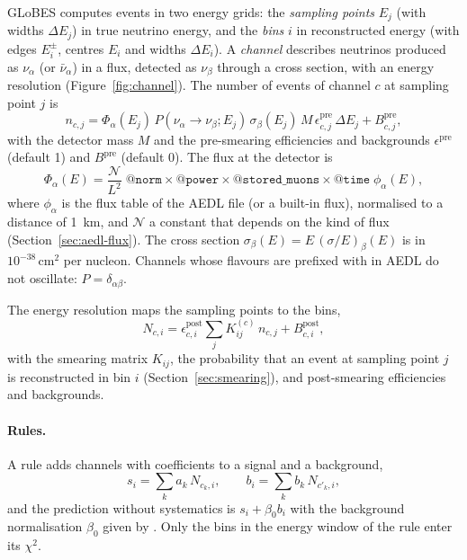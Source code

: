 GLoBES computes events in two energy grids: the \emph{sampling points} $E_j$
(with widths $\Delta E_j$) in true neutrino energy, and the \emph{bins} $i$ in
reconstructed energy (with edges $E_i^\pm$, centres $E_i$ and widths $\Delta
E_i$). A \emph{channel} describes neutrinos produced as $\nu_\alpha$ (or
$\bar\nu_\alpha$) in a flux, detected as $\nu_\beta$ through a cross section,
with an energy resolution (Figure~\ref{fig:channel}). The number of events of
channel $c$ at sampling point $j$ is
\begin{equation}
n_{c,j} = \Phi_\alpha(E_j)\,P(\nu_\alpha\to\nu_\beta;E_j)\,\sigma_\beta(E_j)\,M\,
          \epsilon^\text{pre}_{c,j}\,\Delta E_j + B^\text{pre}_{c,j},
\label{eq:presmear}
\end{equation}
with the detector mass $M$ and the pre-smearing efficiencies and backgrounds
$\epsilon^\text{pre}$ (default 1) and $B^\text{pre}$ (default 0). The flux at
the detector is
\begin{equation}
\Phi_\alpha(E) = \frac{\mathcal N}{L^2}\;\texttt{@norm}\times\texttt{@power}\times
  \texttt{@stored\_muons}\times\texttt{@time}\;\phi_\alpha(E),
\label{eq:flux}
\end{equation}
where $\phi_\alpha$ is the flux table of the AEDL file (or a built-in flux),
normalised to a distance of 1~km, and $\mathcal N$ a constant that depends on
the kind of flux (Section~\ref{sec:aedl-flux}). The cross section $\sigma_\beta(E)
= E\,(\sigma/E)_\beta(E)$ is in $10^{-38}\,\mathrm{cm}^2$ per nucleon. Channels
whose flavours are prefixed with  in AEDL do not oscillate:
$P=\delta_{\alpha\beta}$.

The energy resolution maps the sampling points to the bins,
\begin{equation}
N_{c,i} = \epsilon^\text{post}_{c,i}\sum_j K^{(c)}_{ij}\,n_{c,j} + B^\text{post}_{c,i},
\label{eq:postsmear}
\end{equation}
with the smearing matrix $K_{ij}$, the probability that an event at sampling
point $j$ is reconstructed in bin $i$ (Section~\ref{sec:smearing}), and
post-smearing efficiencies and backgrounds.

\paragraph{Rules.} A rule adds channels with coefficients to a signal and a
background,
\begin{equation}
s_i = \sum_k a_k\,N_{c_k,i},\qquad b_i = \sum_k b_k\,N_{c'_k,i},
\label{eq:rule}
\end{equation}
and the prediction without systematics is $s_i + \beta_0 b_i$ with the
background normalisation $\beta_0$ given by . Only the
bins in the energy window of the rule enter its $\chi^2$.

